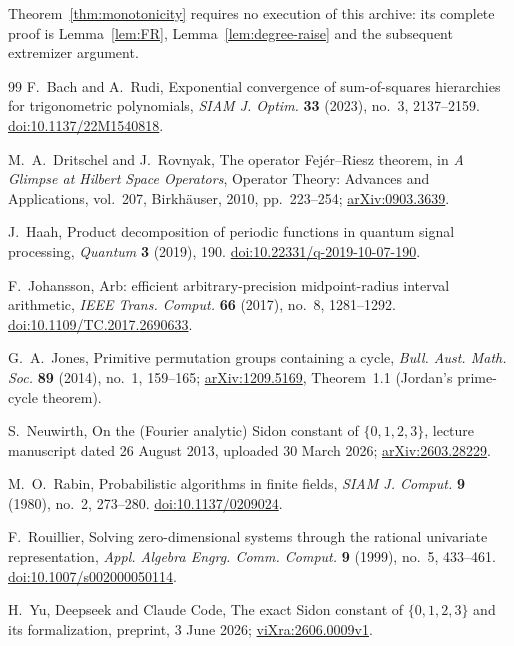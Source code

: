 \documentclass[11pt]{article}
\begin{document}
Theorem~\ref{thm:monotonicity} requires no execution of this archive:
its complete proof is Lemma~\ref{lem:FR}, Lemma~\ref{lem:degree-raise}
and the subsequent extremizer argument.


\begin{thebibliography}{99}
F.~Bach and A.~Rudi, Exponential convergence of sum-of-squares hierarchies
for trigonometric polynomials, \emph{SIAM J. Optim.} \textbf{33} (2023),
no.~3, 2137--2159.
\href{https://doi.org/10.1137/22M1540818}{doi:10.1137/22M1540818}.

M.~A.~Dritschel and J.~Rovnyak, The operator Fej\'er--Riesz theorem,
in \emph{A Glimpse at Hilbert Space Operators}, Operator Theory: Advances
and Applications, vol.~207, Birkh\"auser, 2010, pp.~223--254;
\href{https://arxiv.org/abs/0903.3639}{arXiv:0903.3639}.

J.~Haah, Product decomposition of periodic functions in quantum signal
processing, \emph{Quantum} \textbf{3} (2019), 190.
\href{https://doi.org/10.22331/q-2019-10-07-190}{doi:10.22331/q-2019-10-07-190}.

F.~Johansson, Arb: efficient arbitrary-precision midpoint-radius interval
arithmetic, \emph{IEEE Trans. Comput.} \textbf{66} (2017), no.~8, 1281--1292.
\href{https://doi.org/10.1109/TC.2017.2690633}{doi:10.1109/TC.2017.2690633}.

G.~A.~Jones, Primitive permutation groups containing a cycle,
\emph{Bull. Aust. Math. Soc.} \textbf{89} (2014), no.~1, 159--165;
\href{https://arxiv.org/abs/1209.5169}{arXiv:1209.5169}, Theorem~1.1
(Jordan's prime-cycle theorem).

S.~Neuwirth, On the (Fourier analytic) Sidon constant of $\{0,1,2,3\}$,
lecture manuscript dated 26 August 2013, uploaded 30 March 2026;
\href{https://arxiv.org/abs/2603.28229}{arXiv:2603.28229}.

M.~O.~Rabin, Probabilistic algorithms in finite fields,
\emph{SIAM J. Comput.} \textbf{9} (1980), no.~2, 273--280.
\href{https://doi.org/10.1137/0209024}{doi:10.1137/0209024}.

F.~Rouillier, Solving zero-dimensional systems through the rational
univariate representation, \emph{Appl. Algebra Engrg. Comm. Comput.}
\textbf{9} (1999), no.~5, 433--461.
\href{https://doi.org/10.1007/s002000050114}{doi:10.1007/s002000050114}.

H.~Yu, Deepseek and Claude Code, The exact Sidon constant of
$\{0,1,2,3\}$ and its formalization, preprint, 3 June 2026;
\href{https://ai.vixra.org/pdf/2606.0009v1.pdf}{viXra:2606.0009v1}.
\end{thebibliography}
\end{document}

